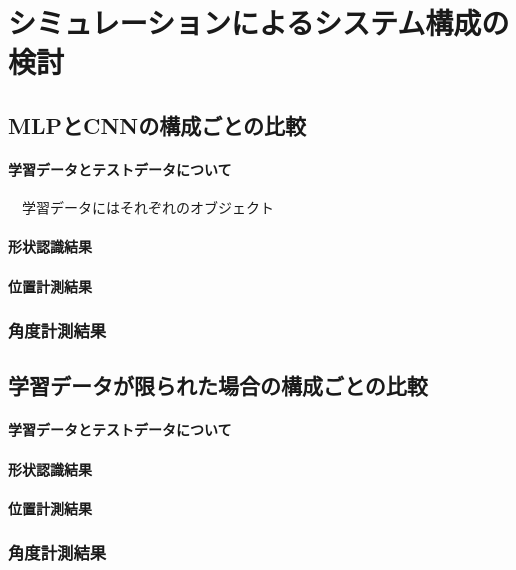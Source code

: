 \chapter{シミュレーションによるシステム構成の検討}


\section{MLPとCNNの構成ごとの比較}

\subsubsection{学習データとテストデータについて}
　学習データにはそれぞれのオブジェクト

\subsubsection{形状認識結果}

\subsubsection{位置計測結果}

\subsection{角度計測結果}


\section{学習データが限られた場合の構成ごとの比較}

\subsubsection{学習データとテストデータについて}

\subsubsection{形状認識結果}

\subsubsection{位置計測結果}

\subsection{角度計測結果}


